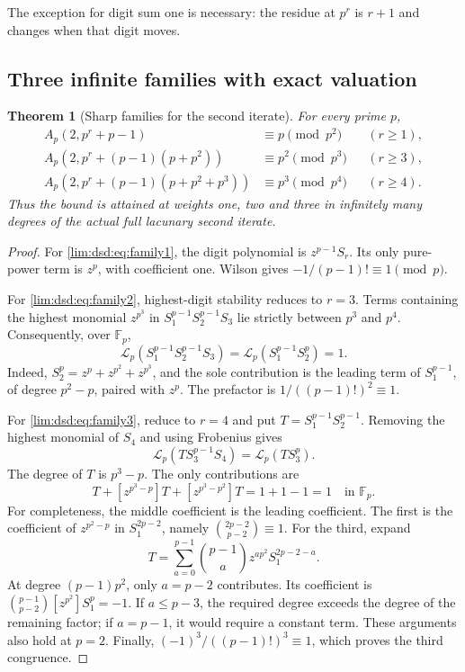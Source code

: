 \documentclass[11pt]{article}
\newtheorem{theorem}{Theorem}[section]
\theoremstyle{definition}
\theoremstyle{remark}
\newcommand{\Fp}{\mathbb F_p}
\newcommand{\Lfun}{\mathcal L_p}
\begin{document}
The exception for digit sum one is necessary: the residue at $p^r$
is $r+1$ and changes when that digit moves.

\subsection{Three infinite families with exact valuation}

\begin{theorem}[Sharp families for the second iterate]
\label{lim:dsd:thm:families}
For every prime $p$,
\begin{align}
 A_p(2,p^r+p-1)&\equiv p\pmod{p^2}
 &&(r\ge1),\label{lim:dsd:eq:family1}\\
 A_p(2,p^r+(p-1)(p+p^2))&\equiv p^2\pmod{p^3}
 &&(r\ge3),\label{lim:dsd:eq:family2}\\
 A_p(2,p^r+(p-1)(p+p^2+p^3))&\equiv p^3\pmod{p^4}
 &&(r\ge4).\label{lim:dsd:eq:family3}
\end{align}
Thus the bound is attained at weights one, two and three in infinitely
many degrees of the actual full lacunary second iterate.
\end{theorem}
\begin{proof}
For \eqref{lim:dsd:eq:family1}, the digit polynomial is $z^{p-1}S_r$.
Its only pure-power term is $z^p$, with coefficient one. Wilson
gives $-1/(p-1)!\equiv1\pmod p$.

For \eqref{lim:dsd:eq:family2}, highest-digit stability reduces to $r=3$.
Terms containing the highest monomial $z^{p^3}$ in
$S_1^{p-1}S_2^{p-1}S_3$ lie strictly between $p^3$ and $p^4$.
Consequently, over $\Fp$,
\[
 \Lfun(S_1^{p-1}S_2^{p-1}S_3)
 =\Lfun(S_1^{p-1}S_2^p)=1.
\]
Indeed, $S_2^p=z^p+z^{p^2}+z^{p^3}$, and the sole contribution
is the leading term of $S_1^{p-1}$, of degree $p^2-p$, paired
with $z^p$. The prefactor is $1/((p-1)!)^2\equiv1$.

For \eqref{lim:dsd:eq:family3}, reduce to $r=4$ and put
$T=S_1^{p-1}S_2^{p-1}$. Removing the highest monomial of $S_4$
and using Frobenius gives
\[
 \Lfun(TS_3^{p-1}S_4)=\Lfun(TS_3^p).
\]
The degree of $T$ is $p^3-p$. The only contributions are
\begin{equation}
 [z^{p^2-p}]T+[z^{p^3-p}]T+[z^{p^3-p^2}]T=1+1-1=1
 \quad\text{in }\Fp.
 \label{lim:dsd:eq:three-coefficients}
\end{equation}
For completeness, the middle coefficient is the leading coefficient.
The first is the coefficient of $z^{p^2-p}$ in $S_1^{2p-2}$,
namely $\binom{2p-2}{p-2}\equiv1$. For the third, expand
\[
 T=\sum_{a=0}^{p-1}\binom{p-1}{a}
 z^{ap^2}S_1^{2p-2-a}.
\]
At degree $(p-1)p^2$, only $a=p-2$ contributes. Its coefficient
is $\binom{p-1}{p-2}[z^{p^2}]S_1^p=-1$. If $a\le p-3$,
the required degree exceeds the degree of the remaining factor;
if $a=p-1$, it would require a constant term. These arguments
also hold at $p=2$. Finally, $(-1)^3/((p-1)!)^3\equiv1$,
which proves the third congruence.
\end{proof}
\end{document}
